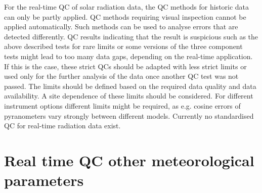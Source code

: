 For the real-time QC of solar radiation data, the QC methods for historic data can only be partly applied. QC methods requiring visual inspection cannot be applied automatically. Such methods can be used to analyse errors that are detected differently. QC results indicating that the result is suspicious such as the above described tests for rare limits or some versions of the three component tests might lead to too many data gaps, depending on the real-time application. If this is the case, these strict QCs should be adapted with less strict limits or used only for the further analysis of the data once another QC test was not passed. The limits should be defined based on the required data quality and data availability. A site dependence of these limits should be considered. For different instrument options different limits might be required, as e.g. cosine errors of pyranometers vary strongly between different models. Currently no standardised QC for real-time radiation data exist. 



\section{Real time QC other meteorological parameters {\color{red}{Comment from COM (21.07.2021: Do we really need that ? }}}





